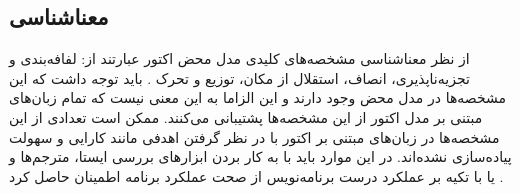 \subsection{\gls{معناشناسی}}
از نظر معناشناسی مشخصه‌های کلیدی مدل محض اکتور عبارتند از: لفافه‌بندی و
  \gls{تجزیه‌ناپذیر}‌ی، \gls{انصاف}، 
  استقلال از مکان، توزیع و تحرک
 \cite{KarmaniAgha_Actors_11}. 
  باید توجه داشت که این مشخصه‌ها در مدل محض  وجود دارند و این الزاما به این معنی نیست که تمام زبان‌های مبتنی بر مدل اکتور از این مشخصه‌ها پشتیبانی می‌کنند. ممکن است تعدادی از این مشخصه‌ها در  زبان‌های مبتنی بر اکتور  با در نظر گرفتن اهدفی مانند کارایی و سهولت پیاده‌سازی نشده‌اند. در این موارد باید با به کار بردن ابزار‌های بررسی ایستا، مترجم‌ها و یا با تکیه بر عملکرد درست برنامه‌نویس از صحت عملکرد برنامه‌ اطمینان حاصل کرد \cite{ActorsJVM2009}. 
